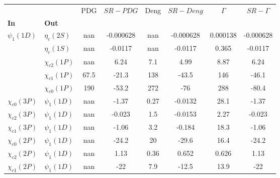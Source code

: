 \begin{tabular}{l|l|c|c|c|c|c|c}
\toprule
                &                &  PDG &  $SR-PDG$ &  Deng & $SR-Deng$ &  $\Gamma$ & $SR-\Gamma$ \\
\textbf{In} & \textbf{Out} &      &           &       &           &           &             \\
\midrule
\textbf{$\psi_{1}(1D)$} & \textbf{$\eta_{c}(2S)$} &  nan & -0.000628 &   nan & -0.000628 &  0.000138 &   -0.000628 \\
                & \textbf{$\eta_{c}(1S)$} &  nan &   -0.0117 &   nan &   -0.0117 &     0.365 &     -0.0117 \\
                & \textbf{$\chi_{c2}(1P)$} &  nan &      6.24 &   7.1 &      4.99 &      8.87 &        6.24 \\
                & \textbf{$\chi_{c1}(1P)$} & 67.5 &     -21.3 &   138 &     -43.5 &       146 &       -46.1 \\
                & \textbf{$\chi_{c0}(1P)$} &  190 &     -53.2 &   272 &       -76 &       288 &       -80.4 \\
\textbf{$\chi_{c0}(3P)$} & \textbf{$\psi_{1}(1D)$} &  nan &     -1.37 &  0.27 &   -0.0132 &      28.1 &       -1.37 \\
\textbf{$\chi_{c2}(3P)$} & \textbf{$\psi_{1}(1D)$} &  nan &    -0.023 &   1.5 &   -0.0153 &      2.27 &      -0.023 \\
\textbf{$\chi_{c1}(3P)$} & \textbf{$\psi_{1}(1D)$} &  nan &     -1.06 &   3.2 &    -0.184 &      18.3 &       -1.06 \\
\textbf{$\chi_{c0}(2P)$} & \textbf{$\psi_{1}(1D)$} &  nan &     -24.2 &    20 &     -29.6 &      16.4 &       -24.2 \\
\textbf{$\chi_{c2}(2P)$} & \textbf{$\psi_{1}(1D)$} &  nan &      1.13 &  0.36 &     0.652 &     0.626 &        1.13 \\
\textbf{$\chi_{c1}(2P)$} & \textbf{$\psi_{1}(1D)$} &  nan &       -22 &   7.9 &     -12.5 &      13.9 &         -22 \\
\bottomrule
\end{tabular}

